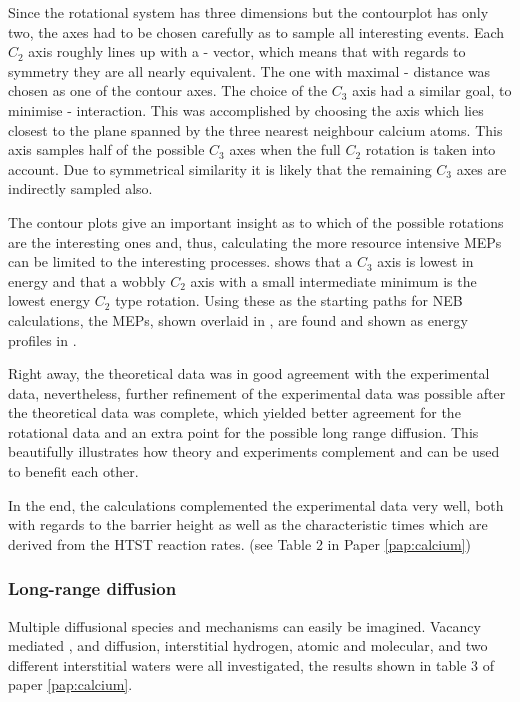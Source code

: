 Since the rotational system has three dimensions but the contourplot has only two, the axes had to be chosen carefully as to sample all interesting events.
Each $C_2$ axis roughly lines up with a - vector, which means that with regards to symmetry they are all nearly equivalent.
The one with maximal - distance was chosen as one of the contour axes.
The choice of the $C_3$ axis had a similar goal, to minimise - interaction.
This was accomplished by choosing the axis which lies closest to the plane spanned by the three nearest neighbour calcium atoms.
This axis samples half of the possible $C_3$ axes when the full $C_2$ rotation is taken into account.
Due to symmetrical similarity it is likely that the remaining $C_3$ axes are indirectly sampled also.

The contour plots give an important insight as to which of the possible rotations are the interesting ones and, thus, calculating the more resource intensive MEPs can be limited to the interesting processes.
 shows that a $C_3$ axis is lowest in energy and that a wobbly $C_2$ axis with a small intermediate minimum is the lowest energy $C_2$ type rotation.
Using these as the starting paths for NEB calculations, the MEPs, shown overlaid in , are found and shown as energy profiles in .

Right away, the theoretical data was in good agreement with the experimental data, nevertheless, further refinement of the experimental data was possible after the theoretical data was complete, which yielded better agreement for the rotational data and an extra point for the possible long range diffusion.
This beautifully illustrates how theory and experiments complement and can be used to benefit each other.

In the end, the calculations complemented the experimental data very well, both with regards to the barrier height as well as the characteristic times which are derived from the HTST reaction rates. (see Table 2 in Paper \ref{pap:calcium})

\subsubsection{Long-range diffusion}
Multiple diffusional species and mechanisms can easily be imagined.
Vacancy mediated ,   and  diffusion, interstitial hydrogen, atomic and molecular, and two different interstitial waters were all investigated, the results shown in table 3 of paper \ref{pap:calcium}.

